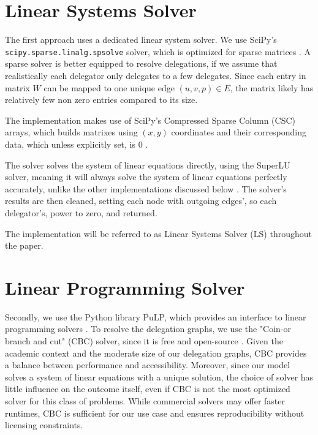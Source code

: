 \section{Linear Systems Solver}

The first approach uses a dedicated linear system solver. We use SciPy's \texttt{scipy.sparse\-.linalg.spsolve} solver, which is optimized for sparse matrices \cite{virtanenSciPy10Fundamental2020}. A sparse solver is better equipped to resolve delegations, if we assume that realistically each delegator only delegates to a few delegates. Since each entry in matrix $W$ can be mapped to one unique edge $(u, v, p) \in E$, the matrix likely has relatively few non zero entries compared to its size.
 
 The implementation makes use of SciPy's Compressed Sparse Column (CSC) arrays, which builds matrixes using $(x,y)$ coordinates and their corresponding data, which unless explicitly set, is 0  \cite{virtanenSciPy10Fundamental2020}. 

The solver solves the system of linear equations directly, using the SuperLU solver, meaning it will always solve the system of linear equations perfectly accurately, unlike the other implementations discussed below \cite{liSuperLUUsersGuide1999}.  The solver's results are then cleaned, setting each node with outgoing edges', so each delegator's, power to zero, and returned.

The implementation will be referred to as Linear Systems Solver (LS) throughout the paper.

\section{Linear Programming Solver}

Secondly, we use the Python library PuLP, which provides an interface to linear programming solvers \cite{osullivanPuLPLinearProgramming2011}. To resolve the delegation graphs, we use the "Coin-or branch and cut" (CBC) solver, since it is free and open-source \cite{johnforrestCoinorCbcRelease2024}. Given the academic context and the moderate size of our delegation graphs, CBC provides a balance between performance and accessibility. Moreover, since our model solves a system of linear equations with a unique solution, the choice of solver has little influence on the outcome itself, even if CBC is not the most optimized solver for this class of problems. While commercial solvers may offer faster runtimes, CBC is sufficient for our use case and ensures reproducibility without licensing constraints.


